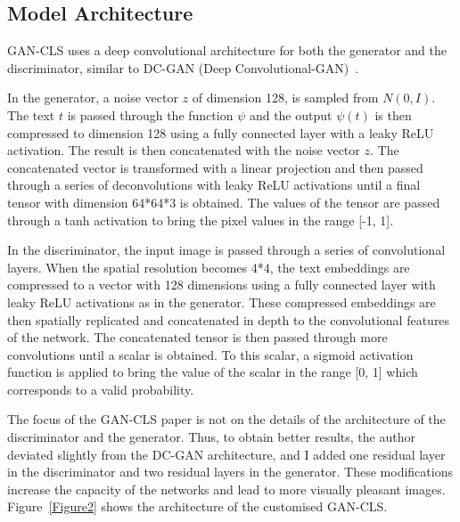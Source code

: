 \documentclass[10pt,twocolumn,letterpaper]{article}
\begin{document}
\subsection{Model Architecture}
GAN-CLS uses a deep convolutional architecture for both the generator and the discriminator, similar to DC-GAN (Deep Convolutional-GAN)~\cite{name10}.
\par In the generator, a noise vector $z$ of dimension 128, is sampled from $N(0, I)$. The text $t$ is passed through the function $\psi$ and the output $\psi(t)$ is then compressed to dimension 128 using a fully connected layer with a leaky ReLU activation. The result is then concatenated with the noise vector $z$. The concatenated vector is transformed with a linear projection and then passed through a series of deconvolutions with leaky ReLU activations until a final tensor with dimension 64*64*3 is obtained. The values of the tensor are passed through a tanh activation to bring the pixel values in the range [-1, 1].
\par In the discriminator, the input image is passed through a series of convolutional layers. When the spatial resolution becomes 4*4, the text embeddings are compressed to a vector with 128 dimensions using a fully connected layer with leaky ReLU activations as in the generator. These compressed embeddings are then spatially replicated and concatenated in depth to the convolutional features of the network. The concatenated tensor is then passed through more convolutions until a scalar is obtained. To this scalar, a sigmoid activation function is applied to bring the value of the scalar in the range [0, 1] which corresponds to a valid probability.
\par The focus of the GAN-CLS paper is not on the details of the architecture of the discriminator and the generator. Thus, to obtain better results, the author deviated slightly from the DC-GAN architecture, and I added one residual layer~\cite{name11} in the discriminator and two residual layers in the generator. These modifications increase the capacity of the networks and lead to more visually pleasant images. Figure~\ref{Figure2} shows the architecture of the customised GAN-CLS.


\end{document}

